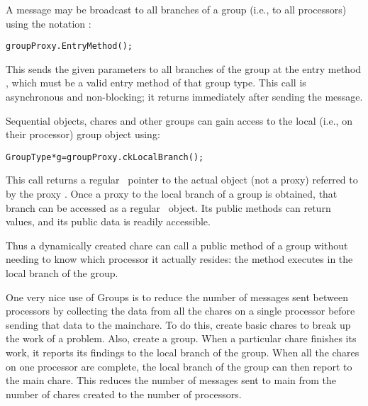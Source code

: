 A message may be broadcast  to all branches of a group
(i.e., to all processors) using the notation :

\begin{alltt}
 groupProxy.EntryMethod();
\end{alltt}

This sends the given parameters to all branches of the group at
the entry method , which must be a valid entry method of that
group type. This call is asynchronous and non-blocking; it returns immediately
after sending the message.


Sequential objects, chares and other groups can gain access to the local
(i.e., on their processor) group object using:

\begin{alltt}
GroupType *g=groupProxy.ckLocalBranch();
\end{alltt}

This call returns a regular \CC\ pointer to the actual object (not a proxy)
referred to by the proxy .  Once a proxy to the
local branch of a group is obtained, that branch can be accessed as a regular
\CC\ object.  Its public methods can return values, and its public data is 
readily accessible.

Thus a dynamically created chare can call a public method of a
group without needing to know which processor it actually resides: the method
executes in the local branch of the group.

One very nice use of Groups is to reduce the number of messages sent between
processors by collecting the data from all the chares on a single processor
before sending that data to the mainchare.  To do this, create basic chares to
break up the work of a problem.  Also, create a group.  When a particular chare
finishes its work, it reports its findings to the local branch of the group.
When all the chares on one processor are complete, the local branch of the
group can then report to the main chare.  This reduces the number of messages
sent to main from the number of chares created to the number of processors. 







